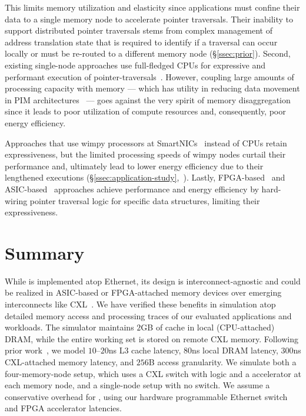 This limits memory utilization and elasticity since applications must confine their data to a single memory node to accelerate pointer traversals. Their inability to support distributed pointer traversals stems from complex management of address translation state that is required to identify if a traversal can occur locally or must be re-routed to a different memory node (\S\ref{ssec:prior}). Second, existing single-node approaches use full-fledged CPUs for expressive and performant execution of pointer-traversals~\cite{storagefunctions, splinter, aifm, kayak_nsdi_21}. However, coupling large amounts of processing capacity with memory --- which has utility in reducing data movement in PIM architectures~\cite{ahn2015scalable, dai2018graphh, schuiki2018scalable, mutlu2019processing, mutlu2022modern, oliveira2022accelerating, eckert2022eidetic, xie2023mpu, tu2022redcim, lockerman2020livia, asghari2016chameleon, devic2022_PIM, wang2022_Nearstream} ---  goes against the very spirit of memory disaggregation since it leads to poor utilization of compute resources and, consequently, poor energy efficiency. 

Approaches that use wimpy processors at SmartNICs~\cite{rmc_hotnets20, redn} instead of CPUs retain expressiveness, but the limited processing speeds of wimpy nodes curtail their performance and, ultimately lead to lower energy efficiency due to their lengthened executions (\S\ref{ssec:application-study},~\cite{clio}). Lastly, FPGA-based~\cite{clio, strom, sun2023demystifying} and ASIC-based~\cite{impica, walkers} approaches achieve performance and energy efficiency by hard-wiring pointer traversal logic for specific data structures, limiting their expressiveness.  


\section{Summary}
\label{sec:future}


While \pulse is implemented atop Ethernet, its design is interconnect-agnostic and could be realized in ASIC-based or FPGA-attached memory devices over emerging interconnects like CXL~\cite{cxl, cxl_azure, sun2023demystifying}. We have verified these benefits in simulation atop detailed memory access and processing traces of our evaluated applications and workloads. The simulator maintains $2$GB of cache in local (CPU-attached) DRAM, while the entire working set is stored on remote CXL memory. Following prior work~\cite{pond}, we model $10$--$20$ns L3 cache latency, $80$ns local DRAM latency, $300$ns CXL-attached memory latency, and $256$B access granularity. We simulate both a four-memory-node setup, which uses a CXL switch with \pulse logic and a \pulse accelerator at each memory node, and a single-node setup with no switch. We assume a conservative overhead for \pulse, using our hardware programmable Ethernet switch and FPGA accelerator latencies.
 
